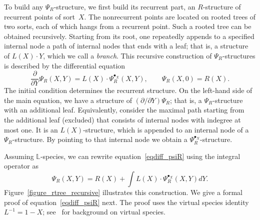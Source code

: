 \documentclass[a4paper,11pt,UKenglish]{article}
\newcommand{\LL}{\mathbb{L}}
\newcommand{\Lin}{L}
\newcommand{\ddy}[1]{\displaystyle{\frac{\partial{#1}}{\partial Y}}}
\newcommand{\pointX}{^{\bullet_X}}
\theoremstyle{definition}
\begin{document}
To build any $\Psi_R$-structure, we first build its recurrent part,
an $R$-structure of recurrent points of sort~$X$.
The nonrecurrent points are located on rooted trees of two sorts,
each of which hangs from a recurrent point.
Such a rooted tree can be obtained recursively. Starting from
its root, one repeatedly appends to a specified internal node a path
of internal nodes that ends with a leaf; that is, a structure of
$\Lin(X)\cdot Y$, which we call a \emph{branch}.
This recursive construction of $\Psi_R$-structures is described
by the differential equation
%
\begin{equation}\label{eqdiff_psiR}
  \ddy{}\Psi_R(X,Y) = \Lin(X)\cdot\Psi_R\pointX(X,Y),\qquad \Psi_R(X,0)=R(X).
\end{equation}
%
The initial condition determines the recurrent
structure. On the left-hand side of the main equation, we have a
structure of $(\partial/\partial Y)\Psi_R$; that is, a
$\Psi_R$-structure with an additional leaf. Equivalently, consider
the maximal path starting from the additional leaf (excluded) that
consists of internal nodes with indegree at most one. It is an
$\Lin(X)$-structure, which is appended to an internal node of a
$\Psi_R$-structure. By pointing to that internal node we obtain
a $\Psi_R\pointX$-structure.

Assuming $\LL$-species,
we can rewrite equation~\eqref{eqdiff_psiR} using the integral operator as
$$
\Psi_R(X,Y) = R(X) + \int \Lin(X)\cdot\Psi_R\pointX(X,Y)dY.
$$
Figure~\ref{figure_rtree_recursive} illustrates
this construction. We give a formal proof of equation~\eqref{eqdiff_psiR} next.
The proof uses the virtual species identity $\Lin^{-1} = 1-X$;
see~\cite[Section~2.5]{BLL} for background on virtual species.
\end{document}
